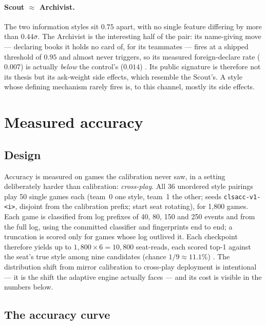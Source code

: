\documentclass[11pt]{article}
\newcommand{\code}[1]{\texttt{#1}}
\begin{document}
\paragraph{Scout $\approx$ Archivist.} The two information styles sit $0.75$ apart, with no
single feature differing by more than $0.44\bar\sigma$. The Archivist is the interesting
half of the pair: its name-giving move --- declaring books it holds no card of, for its
teammates --- fires at a shipped threshold of $0.95$ and almost never triggers, so its
measured foreign-declare rate ($0.007$) is actually \emph{below} the control's ($0.014$)
\cite{v05}. Its public signature is therefore not its thesis but its ask-weight side
effects, which resemble the Scout's. A style whose defining mechanism rarely fires is, to
this channel, mostly its side effects.

\section{Measured accuracy}
\label{sec:accuracy}

\subsection{Design}

Accuracy is measured on games the calibration never saw, in a setting deliberately harder
than calibration: \emph{cross-play}. All 36 unordered style pairings play 50 single games
each (team~0 one style, team~1 the other; seeds \code{clsacc-v1-<i>}, disjoint from the
calibration prefix; start seat rotating), for 1{,}800 games. Each game is classified from log
prefixes of 40, 80, 150 and 250 events and from the full log, using the committed classifier
and fingerprints end to end; a truncation is scored only for games whose log outlived it.
Each checkpoint therefore yields up to $1{,}800 \times 6 = 10{,}800$ seat-reads, each scored
top-1 against the seat's true style among nine candidates (chance $1/9 \approx 11.1\%$)
\cite{artifact}. The distribution shift from mirror calibration to cross-play deployment is
intentional --- it is the shift the adaptive engine \cite{v10} actually faces --- and its
cost is visible in the numbers below.

\subsection{The accuracy curve}
\end{document}
